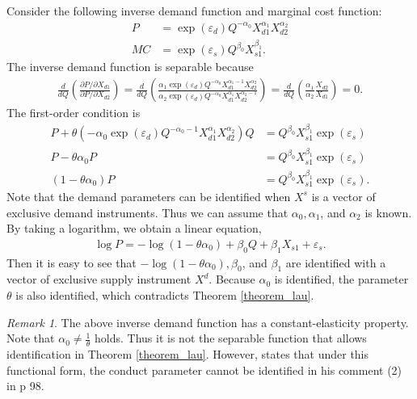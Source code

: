 \documentclass[11pt, a4paper]{article}
\theoremstyle{remark}
\newtheorem{remark}{Remark}
\begin{document}
Consider the following inverse demand function and marginal cost function:
\begin{align}
    P & = \exp(\varepsilon_{d}) Q^{-\alpha_0} X_{d1}^{\alpha_1}X_{d2}^{\alpha_2}\\
    MC & = \exp(\varepsilon_{s})Q^{\beta_0} X_{s1}^{\beta_1}.
\end{align}
The inverse demand function is separable because
\begin{align}
    \frac{d}{dQ} \left(\frac{\partial P/\partial X_{d1}}{\partial P/\partial X_{d2}} \right) = \frac{d}{dQ} \left(\frac{\alpha_{1}\exp(\varepsilon_{d}) Q^{-\alpha_0} X_{d1}^{\alpha_1-1}X_{d2}^{\alpha_2}}{\alpha_2\exp(\varepsilon_{d}) Q^{-\alpha_0} X_{d1}^{\alpha_1}X_{d2}^{\alpha_2-1}} \right) =  \frac{d}{dQ}\left(\frac{\alpha_1}{\alpha_2} \frac{X_{d2}}{X_{d1}} \right)=0.
\end{align}
The first-order condition is
\begin{align}
    P + \theta (-\alpha_0 \exp(\varepsilon_{d})Q^{-\alpha_0-1}X_{d1}^{\alpha_1}X_{d2}^{\alpha_2}) Q & = Q^{\beta_0} X_{s1}^{\beta_1}\exp(\varepsilon_{s})\\
    P - \theta \alpha_0 P & = Q^{\beta_0} X_{s1}^{\beta_1}\exp(\varepsilon_{s})\\
    (1-\theta\alpha_0) P & = Q^{\beta_0} X_{s1}^{\beta_1}\exp(\varepsilon_{s}).
\end{align}
Note that the demand parameters can be identified when $X^s$ is a vector of exclusive demand instruments.
Thus we can assume that $\alpha_0, \alpha_1$, and $\alpha_2$ is known.  
By taking a logarithm, we obtain a linear equation,
\begin{align}
    \log P = - \log(1 - \theta\alpha_0) + \beta_0 Q + \beta_1 X_{s1} + \varepsilon_{s}.
\end{align}
Then it is easy to see that $- \log(1 - \theta\alpha_0), \beta_0$, and $\beta_1$ are identified with a vector of exclusive supply instrument $X^d$.
Because $\alpha_0$ is identified, the parameter $\theta$ is also identified, which contradicts Theorem \ref{theorem_lau}.

\begin{remark}
    The above inverse demand function has a constant-elasticity property. 
    Note that $\alpha_0 \ne \frac{1}{\theta}$ holds.
    Thus it is not the separable function that allows identification in Theorem \ref{theorem_lau}.
    However, \citet{lau1982identifying} states that under this functional form, the conduct parameter cannot be identified in his comment (2) in p 98.
\end{remark}




\newpage


\end{document}
